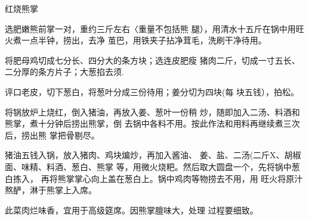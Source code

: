 \begin{recipe}{红烧熊掌}

\ingredients


\cooking

\step 	选肥嫩熊前掌一对，重约三斤左右〈重量不包括熊 腿），用清水十五斤在锅中用旺火煮一点半钟，捞出，去净 茧巴，用铁夹子拈净茸毛，洗刷干净待用。

\step 	将肥母鸡切成七分长、四分大的条方块；选连皮肥瘦 猪肉二斤，切成一寸五长、二分厚的条方片子；大葱掐去须.

评口老皮，切下葱白，将葱叶分成三份待用；姜分切为四块(每 块五钱），拍松。

\step 	将锅放炉上烧红，倒入猪油，再放入姜、葱叶一份稍 炒，随即加入二汤、料酒和熊掌，煮十分钟后捞出熊掌，倒 去锅中各料不用。按此作法和用料再继续煮三次后，捞出熊 掌把骨剔尽。

\step 	猪油五钱入锅，放入猪肉、鸡块煸炒，再加入酱油、 姜、盐、二汤(二斤X、胡椒面、味精、料酒、葱白、熊掌 等，用微火烧粑。然后取大圆盘一个，先将锅中葱白拣入， 再将熊掌掌心向上盖在葱白上。锅中鸡肉等物捞去不用，用 旺火将原汁熬酽，淋于熊掌上入席。

\notes

此菜肉烂味香，宜用于高级筵席。因熊掌膻味大，处理 过程要细致。

\end{recipe}

